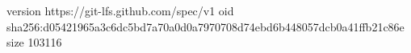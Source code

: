 version https://git-lfs.github.com/spec/v1
oid sha256:d05421965a3c6dc5bd7a70a0d0a7970708d74ebd6b448057dcb0a41ffb21c86e
size 103116
